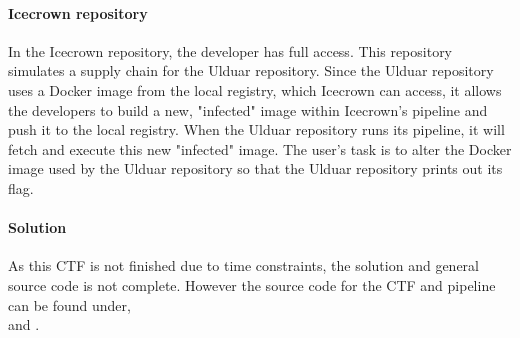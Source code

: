 \paragraph{Icecrown repository}
In the Icecrown repository, the developer has full access. This repository simulates a supply chain for the Ulduar repository. 
Since the Ulduar repository uses a Docker image from the local registry, which Icecrown can access, it allows the developers to build a new, 
"infected" image within Icecrown's pipeline and push it to the local registry. When the Ulduar repository runs its pipeline, 
it will fetch and execute this new "infected" image. 
The user's task is to alter the Docker image used by the Ulduar repository so that the Ulduar repository prints out its flag.

\paragraph{Solution}
As this \ac{CTF} is not finished due to time constraints, the solution and general
source code is not complete. However the source code for the CTF and pipeline can be found under,\\
 and .